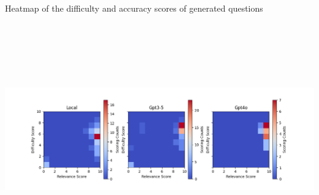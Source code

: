 {
	Heatmap of the difficulty and accuracy scores of generated questions
    \begin{tikzfigure}
        \vspace*{-1.5cm}
        \hspace*{-1cm}
        \includegraphics[height=10cm]{figures/eval_plot.png}
    \end{tikzfigure}
    \vspace*{-2cm}
}